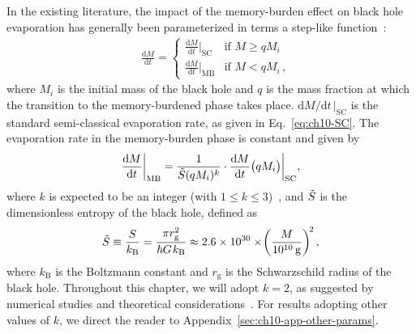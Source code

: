 In the existing literature, the impact of the memory-burden effect on black hole evaporation has generally been parameterized in terms a step-like function~\cite{Dvali:2020wft, Alexandre:2024nuo, Dvali:2024hsb}:
%
\begin{align}
    &\qquad
        \frac{\mathrm{d}M}{\mathrm{d}t} =
        \begin{cases}
            \displaystyle\frac{\mathrm{d} M}{\mathrm{d} t}\Big|_\mathrm{SC}
                & \text{if } M \geq q M_{i}\\[1mm]
            \displaystyle\frac{\mathrm{d} M}{\mathrm{d} t}\Big|_\mathrm{MB}
                & \text{if } M < q M_{i}\, ,
        \end{cases} \quad &
\label{eq:ch10-stepMB}
\end{align}
%
where $M_{i}$ is the initial mass of the black hole and $q$ is the mass fraction at which the transition to the memory-burdened phase takes place. $\mathrm{d}M/\mathrm{d}t\,|_\mathrm{SC}$ is the standard semi-classical evaporation rate, as given in Eq.~\eqref{eq:ch10-SC}. The evaporation rate in the memory-burden phase is constant and given by
%
\begin{align}
    \frac{\mathrm{d}M}{\mathrm{d}t}\bigg|_\mathrm{MB}
        =
            \frac{1}{\Tilde{S}(q M_{i})^k} \cdot
            \frac{\mathrm{d}M}{\mathrm{d}t} \big(qM_{i}\big)\bigg|_\mathrm{SC},
\label{eq:ch10-MB}
\end{align}
%
where $k$ is expected to be an integer (with $1\leq k \leq 3$)~\cite{Dvali:2024hsb}, and $\Tilde{S}$ is the dimensionless entropy of the black hole, defined as~\cite{Bekenstein:1973ur}
%
\begin{equation}
\label{eq:ch10-entropy}
    \Tilde{S}
        \equiv
            \frac{S}{k_\mathrm{B}}
        =
            \frac{\pi r_\mathrm{g}^{2}}{\hbar G\mspace{1.5mu}k_\mathrm{B}}
        \approx
            2.6\times 10^{30} \times \!\left(\frac{M}{10^{10}\,\mathrm{g}}\right)^{\!2}
            ,
\end{equation}
%
where $k_\mathrm{B}$ is the Boltzmann constant and $r_\mathrm{g}$ is the Schwarzschild radius of the black hole. Throughout this chapter, we will adopt $k=2$,
as suggested by numerical studies and theoretical considerations~\cite{Dvali:2020wft,Dvali:2024hsb,Dvali:2017nis}.
For results adopting other values of $k$, we direct the reader to Appendix~\ref{sec:ch10-app-other-params}.

